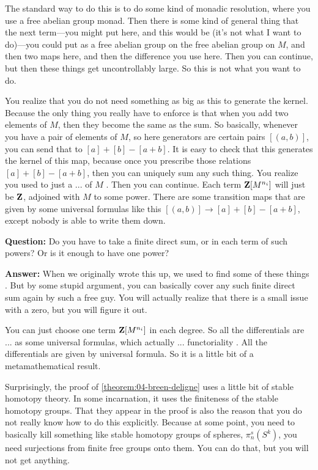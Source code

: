 The standard way to do this is to do some kind of monadic resolution, where you use a free abelian group monad. Then there is some kind of general thing that the next term---you might put here, and this would be (it's not what I want to do)---you could put as a free abelian group on the free abelian group on $M$, and then two maps here, and then the difference you use here. Then you can continue, but then these things get uncontrollably large. So this is not what you want to do.

You realize that you do not need something as big as this to generate the kernel. Because the only thing you really have to enforce is that when you add two elements of $M$, then they become the same as the sum. So basically, whenever you have a pair of elements of $M$, so here generators are certain pairs $[(a,b)]$, you can send that to $[a]+[b]-[a+b]$. It is easy to check that this generates the kernel of this map, because once you prescribe those relations $[a]+[b]-[a+b]$, then you can uniquely sum any such thing. You realize you used to just a ... of $M$ .
Then you can continue. Each term $\mathbf Z[M^{n_i}]$ will just be $\mathbf Z$, adjoined with $M$ to some power. There are some transition maps that are given by some universal formulas like this $[(a,b)] \to [a]+[b]-[a+b]$, except nobody is able to write them down.

\textbf{Question:} Do you have to take a finite direct sum, or in each term of such powers? Or is it enough to have one power? 

\textbf{Answer:} When we originally wrote this up, we used to find some of these things . But by some stupid argument, you can basically cover any such finite direct sum again by such a free guy. You will actually realize that there is a small issue with a zero, but you will figure it out.

You can just choose one term $\mathbf Z[M^{n_i}]$ in each degree. So all the differentials are ... as some universal formulas, which actually ... functoriality . All the differentials are given by universal formula. So it is a little bit of a metamathematical result.

Surprisingly, the proof of \ref{theorem:04-breen-deligne} uses a little bit of stable homotopy theory. In some incarnation, it uses the finiteness of the stable homotopy groups. That they appear in the proof is also the reason that you do not really know how to do this explicitly. Because at some point, you need to basically kill something like stable homotopy groups of spheres, $\pi_n^s(S^k)$, you need surjections from finite free groups onto them. You can do that, but you will not get anything.

